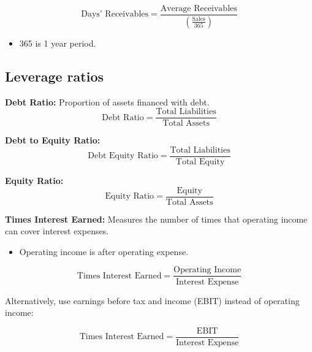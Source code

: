 \begin{definition}
    \begin{equation}
        \text{Days' Receivables} = \frac{\text{Average Receivables}}{\left(\frac{\text{Sales}}{365}\right)}
    \end{equation}

    \begin{itemize}
        \item 365 is 1 year period.
    \end{itemize}
\end{definition}

\subsection{Leverage ratios}
\begin{definition}

    \textbf{Debt Ratio:} Proportion of assets financed with debt.
    \begin{equation}
        \text{Debt Ratio} = \frac{\text{Total Liabilities}}{\text{Total Assets}}
    \end{equation}
    \vspace{1em}
    
    \textbf{Debt to Equity Ratio:}
    \begin{equation}
        \text{Debt Equity Ratio} = \frac{\text{Total Liabilities}}{\text{Total Equity}}
    \end{equation}
    \vspace{1em}
    
    \textbf{Equity Ratio:}
    \begin{equation}
        \text{Equity Ratio} = \frac{\text{Equity}}{\text{Total Assets}}
    \end{equation}
    \vspace{1em}
    
    \textbf{Times Interest Earned:} Measures the number of times that operating income can cover interest expenses.
    \begin{itemize}
        \item Operating income is after operating expense.
    \end{itemize}
    \begin{equation}
        \text{Times Interest Earned} = \frac{\text{Operating Income}}{\text{Interest Expense}}
    \end{equation}

    Alternatively, use earnings before tax and income (EBIT) instead of operating income:

    \begin{equation}
        \text{Times Interest Earned} = \frac{\text{EBIT}}{\text{Interest Expense}}
    \end{equation}
\end{definition}

